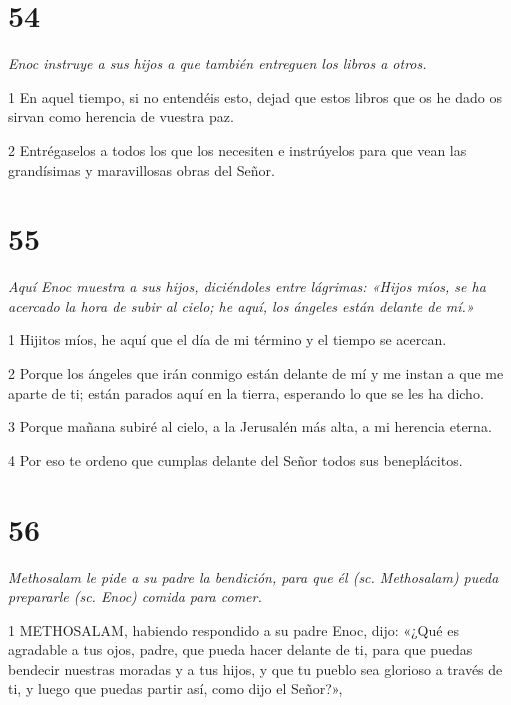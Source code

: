 \chapter{54}

\par \textit{Enoc instruye a sus hijos a que también entreguen los libros a otros.}

\par 1 En aquel tiempo, si no entendéis esto, dejad que estos libros que os he dado os sirvan como herencia de vuestra paz.

\par 2 Entrégaselos a todos los que los necesiten e instrúyelos para que vean las grandísimas y maravillosas obras del Señor.



\chapter{55}

\par \textit{Aquí Enoc muestra a sus hijos, diciéndoles entre lágrimas: «Hijos míos, se ha acercado la hora de subir al cielo; he aquí, los ángeles están delante de mí.»}

\par 1 Hijitos míos, he aquí que el día de mi término y el tiempo se acercan.

\par 2 Porque los ángeles que irán conmigo están delante de mí y me instan a que me aparte de ti; están parados aquí en la tierra, esperando lo que se les ha dicho.

\par 3 Porque mañana subiré al cielo, a la Jerusalén más alta, a mi herencia eterna.

\par 4 Por eso te ordeno que cumplas delante del Señor todos sus beneplácitos.

\chapter{56}

\par \textit{Methosalam le pide a su padre la bendición, para que él (sc. Methosalam) pueda prepararle (sc. Enoc) comida para comer.}

\par 1 METHOSALAM, habiendo respondido a su padre Enoc, dijo: «¿Qué es agradable a tus ojos, padre, que pueda hacer delante de ti, para que puedas bendecir nuestras moradas y a tus hijos, y que tu pueblo sea glorioso a través de ti, y luego que puedas partir así, como dijo el Señor?»,

